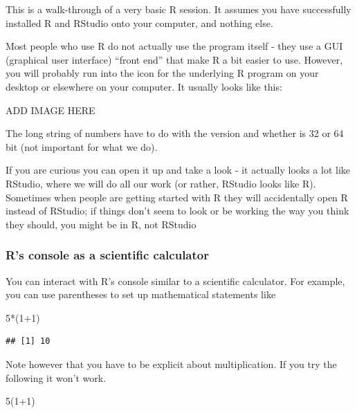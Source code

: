 \documentclass[
]{book}
\newenvironment{Shaded}{\begin{snugshade}}{\end{snugshade}}
\newcommand{\DecValTok}[1]{\textcolor[rgb]{0.00,0.00,0.81}{#1}}
\newcommand{\NormalTok}[1]{#1}
\newcommand{\SpecialCharTok}[1]{\textcolor[rgb]{0.00,0.00,0.00}{#1}}
\begin{document}
This is a walk-through of a very basic R session. It assumes you have successfully installed R and RStudio onto your computer, and nothing else.

Most people who use R do not actually use the program itself - they use a GUI (graphical user interface) ``front end'' that make R a bit easier to use. However, you will probably run into the icon for the underlying R program on your desktop or elsewhere on your computer. It usually looks like this:

ADD IMAGE HERE

The long string of numbers have to do with the version and whether is 32 or 64 bit (not important for what we do).

If you are curious you can open it up and take a look - it actually looks a lot like RStudio, where we will do all our work (or rather, RStudio looks like R). Sometimes when people are getting started with R they will accidentally open R instead of RStudio; if things don't seem to look or be working the way you think they should, you might be in R, not RStudio

\hypertarget{rs-console-as-a-scientific-calculator}{%
\subsubsection{R's console as a scientific calculator}\label{rs-console-as-a-scientific-calculator}}

You can interact with R's console similar to a scientific calculator. For example, you can use parentheses to set up mathematical statements like

\begin{Shaded}
\begin{Highlighting}[]
\DecValTok{5}\SpecialCharTok{*}\NormalTok{(}\DecValTok{1}\SpecialCharTok{+}\DecValTok{1}\NormalTok{)}
\end{Highlighting}
\end{Shaded}

\begin{verbatim}
## [1] 10
\end{verbatim}

Note however that you have to be explicit about multiplication. If you try the following it won't work.

\begin{Shaded}
\begin{Highlighting}[]
\DecValTok{5}\NormalTok{(}\DecValTok{1}\SpecialCharTok{+}\DecValTok{1}\NormalTok{)}
\end{Highlighting}
\end{Shaded}
\end{document}
